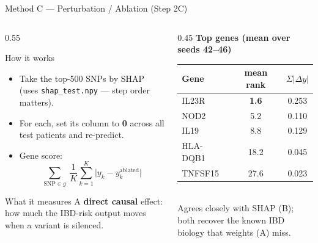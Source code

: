 \documentclass[aspectratio=169]{beamer}
\begin{document}
\begin{frame}{Method C — Perturbation / Ablation (Step 2C)}
    \small
    \begin{columns}[T]
        \begin{column}{0.55\textwidth}
            \begin{block}{How it works}
                \footnotesize
                \begin{itemize}
                    \item Take the top-500 SNPs by SHAP (uses \texttt{shap\_test.npy} --- step order matters).
                    \item For each, set its column to \textbf{0} across all test patients and re-predict.
                    \item Gene score:
                          \[ \sum_{\text{SNP}\in g}\ \frac{1}{K}\sum_{k=1}^{K}\bigl\lvert y_k - y_k^{\text{ablated}}\bigr\rvert \]
                \end{itemize}
            \end{block}
            \begin{block}{What it measures}
                \footnotesize
                A \textbf{direct causal} effect: how much the IBD-risk output moves when a variant is silenced.
            \end{block}
        \end{column}
        \begin{column}{0.45\textwidth}
            \centering
            \scriptsize
            \textbf{Top genes (mean over seeds 42--46)}\\[2pt]
            \begin{tabular}{l c c}
                \toprule
                Gene & mean rank & $\Sigma|\Delta y|$ \\
                \midrule
                IL23R    & \textbf{1.6} & 0.253 \\
                NOD2     & 5.2 & 0.110 \\
                IL19     & 8.8 & 0.129 \\
                HLA-DQB1 & 18.2 & 0.045 \\
                TNFSF15  & 27.6 & 0.023 \\
                \bottomrule
            \end{tabular}\\[4pt]
            \footnotesize Agrees closely with SHAP (B); both recover the known IBD biology that weights (A) miss.
        \end{column}
    \end{columns}
\end{frame}
\end{document}
